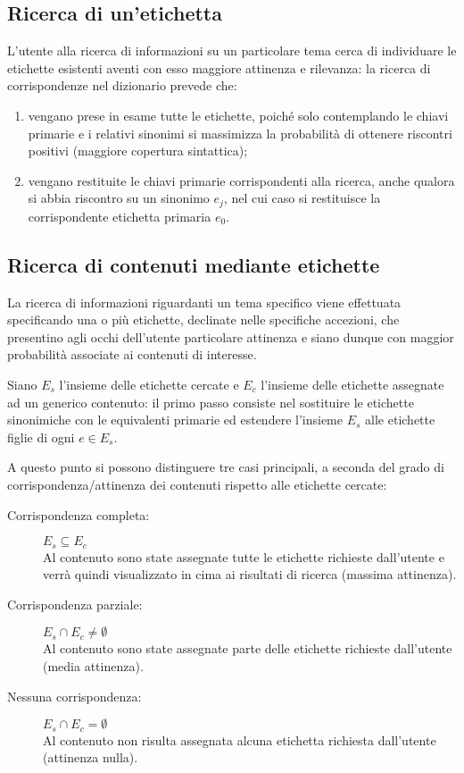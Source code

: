 \documentclass[10pt,a4paper,headinclude,footinclude,hidelinks]{scrreprt} %
\begin{document}
	\subsection{Ricerca di un'etichetta}
	L'utente alla ricerca di informazioni su un particolare tema cerca di individuare le etichette esistenti aventi con esso maggiore attinenza e rilevanza: la ricerca di corrispondenze nel dizionario prevede che:
	\begin{enumerate}
	\item vengano prese in esame tutte le etichette, poiché solo contemplando le chiavi primarie e i relativi sinonimi si massimizza la probabilità di ottenere riscontri positivi (maggiore copertura sintattica);
	\item vengano restituite le chiavi primarie corrispondenti alla ricerca, anche qualora si abbia riscontro su un sinonimo $e_j$, nel cui caso si restituisce la corrispondente etichetta primaria $e_0$.
	\end{enumerate}

	\subsection{Ricerca di contenuti mediante etichette}
	La ricerca di informazioni riguardanti un tema specifico viene effettuata specificando una o più etichette, declinate nelle specifiche accezioni, che presentino agli occhi dell'utente particolare attinenza e siano dunque con maggior probabilità associate ai contenuti di interesse.

	Siano $E_s$ l'insieme delle etichette cercate e $E_c$ l'insieme delle etichette assegnate ad un generico contenuto: il primo passo consiste nel sostituire le etichette sinonimiche con le equivalenti primarie ed estendere l'insieme $E_s$ alle etichette figlie di ogni $e \in E_s$.

	A questo punto si possono distinguere tre casi principali, a seconda del grado di corrispondenza/attinenza dei contenuti rispetto alle etichette cercate:
	\begin{description}
	\item[Corrispondenza completa:] $E_s \subseteq E_c$ \hfill \\
	Al contenuto sono state assegnate tutte le etichette richieste dall'utente e verrà quindi visualizzato in cima ai risultati di ricerca (massima attinenza).
 	\item[Corrispondenza parziale:] $E_s \cap E_c \neq \emptyset$ \hfill \\
	Al contenuto sono state assegnate parte delle etichette richieste dall'utente (media attinenza).
	\item[Nessuna corrispondenza:] $E_s \cap E_c = \emptyset$\hfill \\
	Al contenuto non risulta assegnata alcuna etichetta richiesta dall'utente (attinenza nulla).
	\end{description}
\end{document}
